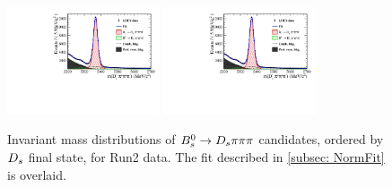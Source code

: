 \begin{figure}[h]
\includegraphics[height=!,width=0.4\textwidth]{figs/MassFit/norm_y16_KKpi_NR.pdf}
\includegraphics[height=!,width=0.4\textwidth]{figs/MassFit/norm_y16_pipipi.pdf}
\caption{Invariant mass distributions of ${{B}^0_{s}}\rightarrow{\ensuremath{{D}_{s}}}{\ensuremath{\pi}}{\ensuremath{\pi}}{\ensuremath{\pi}}$ candidates, ordered by ${{D}_{s}}$ final state, for Run2 data.
The fit described in \ref{subsec: NormFit} is overlaid.}
\label{fig:massfits_norm_Run2}
\end{figure}

\clearpage

